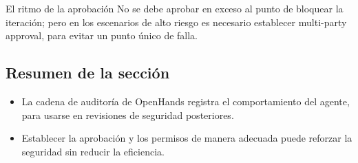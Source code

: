 \begin{warningbox}{El ritmo de la aprobación}
No se debe aprobar en exceso al punto de bloquear la iteración; pero en los escenarios de alto riesgo es necesario establecer multi-party approval, para evitar un punto único de falla.
\end{warningbox}

\subsection{Resumen de la sección}
\begin{itemize}
    \item La cadena de auditoría de OpenHands registra el comportamiento del agente, para usarse en revisiones de seguridad posteriores.
    \item Establecer la aprobación y los permisos de manera adecuada puede reforzar la seguridad sin reducir la eficiencia.
\end{itemize}
